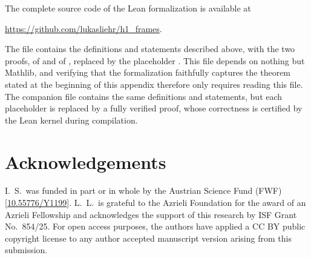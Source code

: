 \documentclass[reqno,a4paper,12pt]{amsart}
\numberwithin{equation}{section}
\begin{document}
The complete source code of the Lean formalization is available at
\begin{center}
\url{https://github.com/lukasliehr/h1_frames}.
\end{center}
The file  contains the definitions and statements described above, with the two proofs, of  and of , replaced by the placeholder . This file depends on nothing but Mathlib, and verifying that the formalization faithfully captures the theorem stated at the beginning of this appendix therefore only requires reading this file. The companion file  contains the same definitions and statements, but each placeholder is replaced by a fully verified proof, whose correctness is certified by the Lean kernel during compilation. 



\section{Acknowledgements}
I.~S.~was funded in part or in whole by the Austrian Science Fund (FWF)  [\href{https://doi.org/10.55776/Y1199}{10.55776/Y1199}].
L.~L.~is grateful to the Azrieli Foundation for the award of an Azrieli Fellowship and acknowledges the support of this research by ISF Grant No.~854/25.
For open access purposes, the authors have applied a CC BY public copyright license to any author accepted manuscript version arising from this submission.



\end{document}
